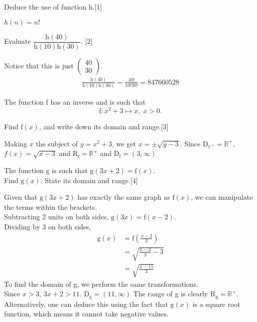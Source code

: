 \documentclass[12pt, a4 paper]{article}
\begin{document}
\begin{outline}[enumerate]
 \2 Deduce the use of function h.\hfill[1]
 \begin{answer}
  \(h(n)=n! \)
 \end{answer}

 \2 Evaluate \(\dfrac{\textrm{h}(40)}{\textrm{h}(10)\textrm{h}(30)}\). \hfill[2]
 \begin{answer}
  Notice that this is just \(\left(\begin{smallmatrix}40\\30\end{smallmatrix}\right)\).
  \begin{align*}
   \frac{\textrm{h}(40)}{\textrm{h}(10)\textrm{h}(30)} = \frac{40!}{10!30!} = 847660528
  \end{align*}
 \end{answer}

 \1 The function f has an inverse and is such that \[\textrm{f}:x^2+3 \mapsto x,\;x>0.\]

 \2 Find \(\textrm{f}(x)\), and write down its domain and range.\hfill[3]
 \begin{answer}
  Making \(x\) the subject of \(y=x^2+3\), we get \(x=\pm\sqrt{y-3}\). Since D\(_{\textrm{f}^{-1}} = \mathbb{R}^+\), \(f(x) = \sqrt{x-3}\) and R\(_\textrm{f}=\mathbb{R}^+\) and D\(_\textrm{f}=(3,\infty)\)
 \end{answer}

 \2 The function g is such that \(\textrm{g}(3x+2)=\textrm{f}(x)\).\\ Find \(\textrm{g}(x)\). State its domain and range.\hfill[4]
 \begin{answer}
  Given that \(\textrm{g}(3x+2)\) has exactly the same graph as \(\textrm{f}(x)\), we can manipulate the terms within the brackets.\\
  Subtracting 2 units on  both sides, \(\textrm{g}(3x)=\textrm{f}(x-2)\).\\
  Dividing by 3 on both sides,
  \begin{align*}
   \textrm{g}(x) & =\textrm{f}\left(\frac{x-2}{3}\right) \\
                 & = \sqrt{\frac{x-2}{3}-3}              \\
                 & = \sqrt{\frac{x-11}{3}}
  \end{align*}
  To find the domain of g, we perform the same transformations.\\
  Since \(x>3\), \(3x+2>11\). D\(_{\textrm{g}}=(11,\infty)\) \newline
  The range of g is clearly R\(_\textrm{g}=\mathbb{R}^+\).\newline \newline
  Alternatively, one can deduce this using the fact that \(\textrm{g}(x)\) is a square root function, which means it cannot take negative values.
 \end{answer}

\end{outline}
\end{document}
